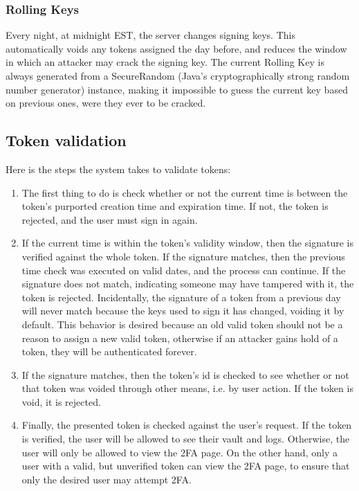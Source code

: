 \documentclass{article}
\begin{document}
\subsubsection{Rolling Keys}
\label{ssub:rolling_keys}
\par Every night, at midnight EST, the server changes signing keys. This automatically voids any tokens assigned the day before, and reduces the window in which an attacker may crack the signing key. The current Rolling Key is always generated from a SecureRandom (Java's cryptographically strong random number generator) instance, making it impossible to guess the current key based on previous ones, were they ever to be cracked.

\subsection{Token validation}
\label{sub:token_validation}
\par Here is the steps the system takes to validate tokens:
\begin{enumerate}[1.]
  \item The first thing to do is check whether or not the current time is between the token's purported creation time and expiration time. If not, the token is rejected, and the user must sign in again.
  \item If the current time is within the token's validity window, then the signature is verified against the whole token. If the signature matches, then the previous time check was executed on valid dates, and the process can continue. If the signature does not match, indicating someone may have tampered with it, the token is rejected. Incidentally, the signature of a token from a previous day will never match because the keys used to sign it has changed, voiding it by default. This behavior is desired because an old valid token should not be a reason to assign a new valid token, otherwise if an attacker gains hold of a token, they will be authenticated forever.
  \item If the signature matches, then the token's id is checked to see whether or not that token was voided through other means, i.e. by user action. If the token is void, it is rejected.
  \item Finally, the presented token is checked against the user's request. If the token is verified, the user will be allowed to see their vault and logs. Otherwise, the user will only be allowed to view the 2FA page. On the other hand, only a user with a valid, but unverified token can view the 2FA page, to ensure that only the desired user may attempt 2FA.
\end{enumerate}
\end{document}
